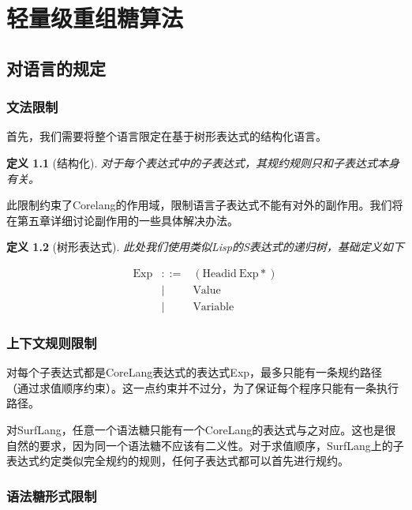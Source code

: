 \pagestyle{fancy}
\normalsize
\linespread{1.5}\selectfont
\label{mark:chapter3}\chapter{轻量级重组糖算法}

\section{对语言的规定}

\subsection{文法限制}
首先，我们需要将整个语言限定在基于树形表达式的结构化语言。

\newtheorem*{Def}{定义}

\label{mark:struct}\begin{Def}[结构化]
	对于每个表达式中的子表达式，其规约规则只和子表达式本身有关。
\end{Def}

此限制约束了Corelang的作用域，限制语言子表达式不能有对外的副作用。我们将在第五章详细讨论副作用的一些具体解决办法。

\begin{Def}[树形表达式]
	此处我们使用类似Lisp的S表达式的递归树，基础定义如下
\end{Def}

\[
\begin{array}{rcl}
\mbox{Exp} &::=& (\mbox{Headid}~\mbox{Exp}*)\\
&|& \mbox{Value}\\
&|& \mbox{Variable}
\end{array}
\]

\subsection{上下文规则限制}


对每个子表达式都是CoreLang表达式的表达式Exp，最多只能有一条规约路径（通过求值顺序约束）。这一点约束并不过分，为了保证每个程序只能有一条执行路径。

对SurfLang，任意一个语法糖只能有一个CoreLang的表达式与之对应。这也是很自然的要求，因为同一个语法糖不应该有二义性。对于求值顺序，SurfLang上的子表达式约定类似完全规约的规则，任何子表达式都可以首先进行规约。

\subsection{语法糖形式限制}

